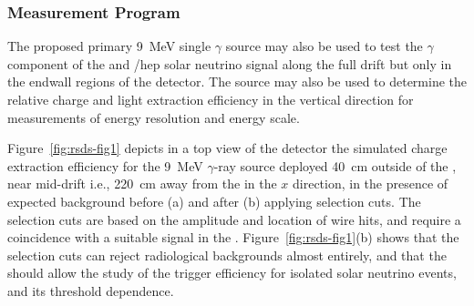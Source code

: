\subsubsection{Measurement Program}
\label{sec:sp-calib-sys-src-dep-meas}

The proposed primary \SI{9}{\MeV} single $\gamma$ source may also be used to test the $\gamma$ component of the  and /hep solar neutrino signal along the full drift but only in the endwall regions of the detector. The source may also be used to determine the relative charge and light extraction efficiency in the vertical direction for measurements of energy resolution and energy scale. 

Figure~\ref{fig:rsds-fig1}
depicts in a top view of the detector the simulated charge extraction efficiency for the 9~MeV $\gamma$-ray source deployed \SI{40}{\cm} outside of the , near mid-drift i.e., \SI{220}{\cm} away from the  in the $x$ direction, in the presence of expected background before (a) and after (b) applying selection cuts. The selection cuts
are based on the amplitude and location of wire hits, and require a coincidence with a suitable signal in the .
Figure~\ref{fig:rsds-fig1}(b)
shows that the selection cuts can reject radiological backgrounds almost entirely, and that
the  should allow the study of the trigger efficiency for isolated solar neutrino events, and its threshold dependence.


